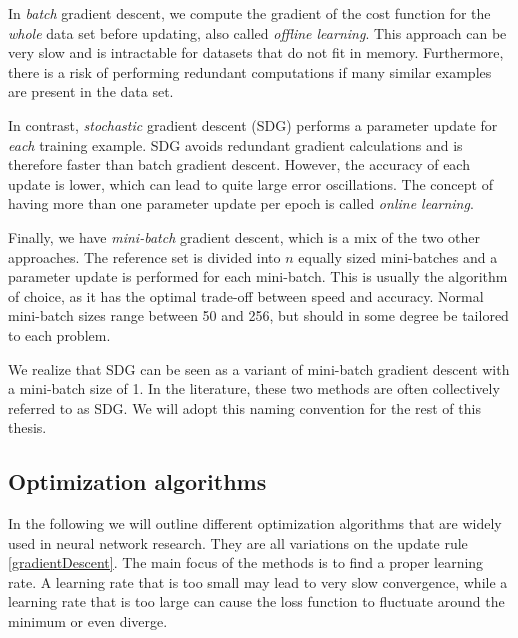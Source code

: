 \documentclass[twoside,english]{uiofysmaster}
\begin{document}
In \textit{batch} gradient descent, 
we compute the gradient of the cost function for the \textit{whole} data set before updating, also called 
\textit{offline learning}. 
This approach can be very slow and is intractable for datasets that do not fit in memory. Furthermore, there is a risk
of performing redundant computations if many similar examples are present in the data set.

In contrast, \textit{stochastic} gradient descent (SDG) performs a parameter update for \textit{each} training example. 
SDG avoids redundant gradient calculations and is therefore faster than batch gradient descent. However, the accuracy 
of each update is lower, which can lead to quite large error oscillations. The concept of having  
more than one parameter update per epoch is called \textit{online learning}. 

Finally, we have \textit{mini-batch} gradient descent, which is a mix of the two other approaches. The reference set 
is divided into $n$ equally sized mini-batches and a parameter update is performed for each mini-batch. This is usually the
algorithm of choice, as it has the optimal trade-off between speed and accuracy. Normal mini-batch sizes range
between 50 and 256, but should in some degree be tailored to each problem. 

We realize that SDG can be seen as 
a variant of mini-batch gradient descent with a mini-batch size of 1. In the literature, these two methods 
are often collectively referred to as SDG. We will adopt this naming convention for the rest of this thesis. 


\subsection{Optimization algorithms} \label{sec:optimizationAlgorithms}
In the following we will outline different optimization algorithms that are widely used in neural network research. 
They are all variations on the update rule \eqref{gradientDescent}. The main focus of the methods is to find
a proper learning rate. A learning rate that is too small may lead to very slow convergence, while 
a learning rate that is too large can cause the loss function to fluctuate around the minimum or even diverge. 
\end{document}
